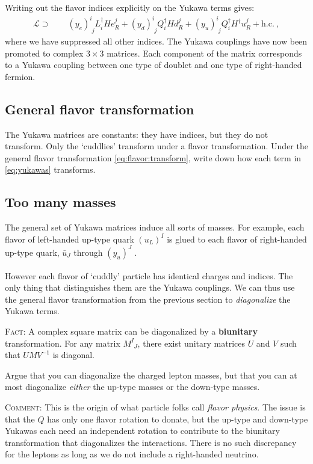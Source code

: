 \documentclass[12pt]{article}
\numberwithin{equation}{section}    %
\begin{document}
Writing out the flavor indices explicitly on the Yukawa terms gives:
\begin{align}
	\mathcal L \supset  &
	\phantom{+}
	(y_e)^i_{\phantom{i}j} L^\dag_i H e_R^j
	+
	(y_d)^i_{\phantom{i}j} Q^\dag_i H d_R^j
	+
	(y_u)^i_{\phantom{i}j} Q^\dag_i H^\dag u_R^j
	+ \text{h.c.} \ ,
\end{align}
where we have suppressed all other indices. The Yukawa couplings have now been promoted to complex $3\times 3$ matrices. Each component of the matrix corresponds to a Yukawa coupling between one type of doublet and one type of right-handed fermion.

\subsection{General flavor transformation}

The Yukawa matrices are constants: they have indices, but they do not transform. Only the `cuddlies' transform under a flavor transformation. Under the general flavor transformation \eqref{eq:flavor:transform}, write down how each term in \eqref{eq:yukawas} transforms.

\subsection{Too many masses}

The general set of Yukawa matrices induce all sorts of masses. For example, each flavor of left-handed up-type quark $(u_L)^I$ is glued to each flavor of right-handed up-type quark, $\bar u_J$ through $(y_u)^J_{\phantom{J I}}$. 

However each flavor of `cuddly' particle has identical charges and indices. The only thing that distinguishes them are the Yukawa couplings. We can thus use the general flavor transformation from the previous section to \emph{diagonalize} the Yukawa terms. 

\textsc{Fact}: A complex square matrix can be diagonalized by a \textbf{biunitary} transformation. For any matrix $M^I_{\phantom{I}J}$, there exist unitary matrices $U$ and $V$ such that $UMV^{-1}$ is diagonal.

Argue that you can diagonalize the charged lepton masses, but that you can at most diagonalize \emph{either} the up-type masses or the down-type masses.

\textsc{Comment}: This is the origin of what particle folks call \emph{flavor physics}. The issue is that the $Q$ has only one flavor rotation to donate, but the up-type and down-type Yukawas each need an independent rotation to contribute to the biunitary transformation that diagonalizes the interactions. There is no such discrepancy for the leptons as long as we do not include a right-handed neutrino. 
\end{document}
